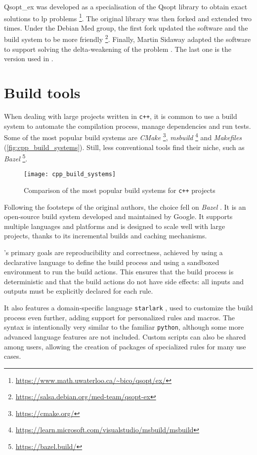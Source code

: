 Qsopt\_ex was developed as a specialisation of the Qsopt library to obtain exact solutions to \gls{lp} problems \footnote{\url{https://www.math.uwaterloo.ca/~bico/qsopt/ex/}}.
The original library was then forked and extended two times.
Under the Debian Med group, the first fork updated the software and the build system to be more friendly \footnote{\url{https://salsa.debian.org/med-team/qsopt-ex}}.
Finally, Martin Sidaway adapted the software to support solving the delta-weakening of the problem \cite{repo:qsopt-ex}.
The last one is the version used in \dlinear.

\section{Build tools}

When dealing with large projects written in \texttt{c++}, it is common to use a build system to automate the compilation process, manage dependencies and run tests.
Some of the most popular build systems are \textit{CMake} \footnote{\url{https://cmake.org/}}, \textit{msbuild} \footnote{\url{https://learn.microsoft.com/visualstudio/msbuild/msbuild}} and \textit{Makefiles} (\autoref{fig:cpp_build_systems}).
Still, less conventional tools find their niche, such as \textit{Bazel} \footnote{\url{https://bazel.build/}}.

\begin{figure}[h]
    \centering
    \texttt{[image: cpp\_build\_systems]}
    \caption{Comparison of the most popular build systems for \texttt{c++} projects \cite{art:cpp-build-system}}\label{fig:cpp_build_systems}
\end{figure}

Following the footsteps of the original authors, the choice fell on \textit{Bazel} \cite{repo:bazel}.
It is an open-source build system developed and maintained by Google.
It supports multiple languages and platforms and is designed to scale well with large projects, thanks to its incremental builds and caching mechanisms.

\bazel's primary goals are reproducibility and correctness, achieved by using a declarative language to define the build process and using a sandboxed environment to run the build actions.
This ensures that the build process is deterministic and that the build actions do not have side effects: all inputs and outputs must be explicitly declared for each rule.

It also features a domain-specific language \texttt{starlark} \cite{repo:starlark}, used to customize the build process even further, adding support for personalized rules and macros.
The syntax is intentionally very similar to the familiar \texttt{python}, although some more advanced language features are not included.
Custom scripts can also be shared among users, allowing the creation of packages of specialized rules for many use cases.

